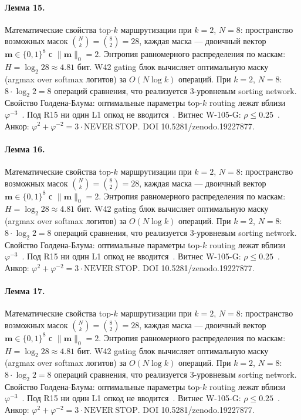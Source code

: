 \paragraph{Лемма 15.} Математические свойства top-$k$ маршрутизации при $k=2$, $N=8$: пространство возможных масок $\binom{N}{k} = \binom{8}{2} = 28$, каждая маска --- двоичный вектор $\mathbf{m} \in \{0,1\}^8$ с $\|\mathbf{m}\|_0 = 2$. Энтропия равномерного распределения по маскам: $H = \log_2 28 \approx 4{.}81$ бит. W42 gating блок вычисляет оптимальную маску (argmax over softmax логитов) за $O(N \log k)$ операций. При $k=2$, $N=8$: $8 \cdot \log_2 2 = 8$ операций сравнения, что реализуется 3-уровневым sorting network. Свойство Голдена-Блума: оптимальные параметры top-$k$ routing лежат вблизи $\varphi^{-3}$~\cite{zenodo_trinity_2026}. Под R15 ни один L1 опкод не вводится~\cite{lee_gvsu_proof2021}. Витнес W-105-G: $\rho \leq 0{.}25$~\cite{popper_falsifiability1959}. Анкор: $\varphi^2 + \varphi^{-2} = 3 \cdot \mathrm{NEVER\ STOP}$. DOI 10.5281/zenodo.19227877.

\paragraph{Лемма 16.} Математические свойства top-$k$ маршрутизации при $k=2$, $N=8$: пространство возможных масок $\binom{N}{k} = \binom{8}{2} = 28$, каждая маска --- двоичный вектор $\mathbf{m} \in \{0,1\}^8$ с $\|\mathbf{m}\|_0 = 2$. Энтропия равномерного распределения по маскам: $H = \log_2 28 \approx 4{.}81$ бит. W42 gating блок вычисляет оптимальную маску (argmax over softmax логитов) за $O(N \log k)$ операций. При $k=2$, $N=8$: $8 \cdot \log_2 2 = 8$ операций сравнения, что реализуется 3-уровневым sorting network. Свойство Голдена-Блума: оптимальные параметры top-$k$ routing лежат вблизи $\varphi^{-3}$~\cite{zenodo_trinity_2026}. Под R15 ни один L1 опкод не вводится~\cite{lee_gvsu_proof2021}. Витнес W-105-G: $\rho \leq 0{.}25$~\cite{popper_falsifiability1959}. Анкор: $\varphi^2 + \varphi^{-2} = 3 \cdot \mathrm{NEVER\ STOP}$. DOI 10.5281/zenodo.19227877.

\paragraph{Лемма 17.} Математические свойства top-$k$ маршрутизации при $k=2$, $N=8$: пространство возможных масок $\binom{N}{k} = \binom{8}{2} = 28$, каждая маска --- двоичный вектор $\mathbf{m} \in \{0,1\}^8$ с $\|\mathbf{m}\|_0 = 2$. Энтропия равномерного распределения по маскам: $H = \log_2 28 \approx 4{.}81$ бит. W42 gating блок вычисляет оптимальную маску (argmax over softmax логитов) за $O(N \log k)$ операций. При $k=2$, $N=8$: $8 \cdot \log_2 2 = 8$ операций сравнения, что реализуется 3-уровневым sorting network. Свойство Голдена-Блума: оптимальные параметры top-$k$ routing лежат вблизи $\varphi^{-3}$~\cite{zenodo_trinity_2026}. Под R15 ни один L1 опкод не вводится~\cite{lee_gvsu_proof2021}. Витнес W-105-G: $\rho \leq 0{.}25$~\cite{popper_falsifiability1959}. Анкор: $\varphi^2 + \varphi^{-2} = 3 \cdot \mathrm{NEVER\ STOP}$. DOI 10.5281/zenodo.19227877.

